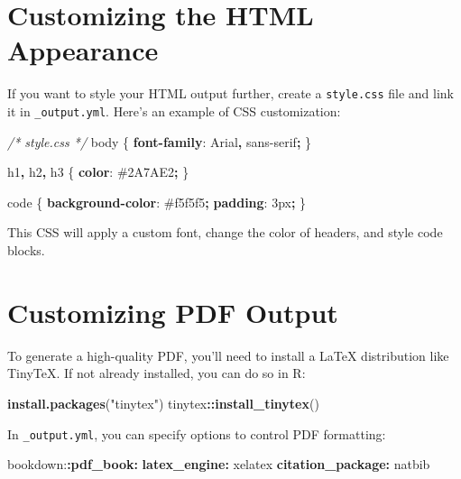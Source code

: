 \documentclass[
]{book}
\newenvironment{Shaded}{\begin{snugshade}}{\end{snugshade}}
\newcommand{\AttributeTok}[1]{\textcolor[rgb]{0.13,0.29,0.53}{#1}}
\newcommand{\CharTok}[1]{\textcolor[rgb]{0.31,0.60,0.02}{#1}}
\newcommand{\CommentTok}[1]{\textcolor[rgb]{0.56,0.35,0.01}{\textit{#1}}}
\newcommand{\ConstantTok}[1]{\textcolor[rgb]{0.56,0.35,0.01}{#1}}
\newcommand{\DataTypeTok}[1]{\textcolor[rgb]{0.13,0.29,0.53}{#1}}
\newcommand{\DecValTok}[1]{\textcolor[rgb]{0.00,0.00,0.81}{#1}}
\newcommand{\FunctionTok}[1]{\textcolor[rgb]{0.13,0.29,0.53}{\textbf{#1}}}
\newcommand{\KeywordTok}[1]{\textcolor[rgb]{0.13,0.29,0.53}{\textbf{#1}}}
\newcommand{\NormalTok}[1]{#1}
\newcommand{\OperatorTok}[1]{\textcolor[rgb]{0.81,0.36,0.00}{\textbf{#1}}}
\newcommand{\SpecialCharTok}[1]{\textcolor[rgb]{0.81,0.36,0.00}{\textbf{#1}}}
\newcommand{\StringTok}[1]{\textcolor[rgb]{0.31,0.60,0.02}{#1}}
\theoremstyle{definition}
\theoremstyle{definition}
\theoremstyle{definition}
\theoremstyle{definition}
\theoremstyle{remark}
\begin{document}
\section{Customizing the HTML Appearance}\label{customizing-the-html-appearance}

If you want to style your HTML output further, create a \texttt{style.css} file and link it in \texttt{\_output.yml}. Here's an example of CSS customization:

\begin{Shaded}
\begin{Highlighting}[]
\CommentTok{/* style.css */}
\NormalTok{body \{}
  \KeywordTok{font{-}family}\CharTok{:} \DecValTok{Arial}\OperatorTok{,} \DecValTok{sans{-}serif}\OperatorTok{;}
\NormalTok{\}}

\NormalTok{h1}\OperatorTok{,}\NormalTok{ h2}\OperatorTok{,}\NormalTok{ h3 \{}
  \KeywordTok{color}\CharTok{:} \ConstantTok{\#2A7AE2}\OperatorTok{;}
\NormalTok{\}}

\NormalTok{code \{}
  \KeywordTok{background{-}color}\CharTok{:} \ConstantTok{\#f5f5f5}\OperatorTok{;}
  \KeywordTok{padding}\CharTok{:} \DecValTok{3}\DataTypeTok{px}\OperatorTok{;}
\NormalTok{\}}
\end{Highlighting}
\end{Shaded}

This CSS will apply a custom font, change the color of headers, and style code blocks.

\section{Customizing PDF Output}\label{customizing-pdf-output}

To generate a high-quality PDF, you'll need to install a LaTeX distribution like TinyTeX. If not already installed, you can do so in R:

\begin{Shaded}
\begin{Highlighting}[]
\FunctionTok{install.packages}\NormalTok{(}\StringTok{"tinytex"}\NormalTok{)}
\NormalTok{tinytex}\SpecialCharTok{::}\FunctionTok{install\_tinytex}\NormalTok{()}
\end{Highlighting}
\end{Shaded}

In \texttt{\_output.yml}, you can specify options to control PDF formatting:

\begin{Shaded}
\begin{Highlighting}[]
\AttributeTok{bookdown:}\FunctionTok{:pdf\_book}\KeywordTok{:}
\AttributeTok{  }\FunctionTok{latex\_engine}\KeywordTok{:}\AttributeTok{ xelatex}
\AttributeTok{  }\FunctionTok{citation\_package}\KeywordTok{:}\AttributeTok{ natbib}
\end{Highlighting}
\end{Shaded}
\end{document}
